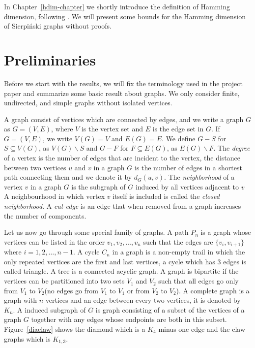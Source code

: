 \documentclass[12pt,a4paper,titlepage,openany]{report}
\begin{document}
In Chapter~\ref{hdim-chapter} we shortly introduce the definition of Hamming dimension, following \cite{Sandi}. We will present some bounds for the Hamming dimension of Sierpi\'nski graphs without proofs.



\chapter{Preliminaries}
\thispagestyle{fancy}

Before we start with the results, we will fix the terminology used in the project paper and summarize some basic result about graphs. We only consider finite, undirected, and simple graphs without isolated vertices.

 A graph consist of vertices which are connected by edges, and we write a graph $G$ as $G=(V,E)$, where $V$ is the vertex set and $E$ is the edge set in $G$. If $G=(V,E)$, we write $V(G)=V$ and $E(G)=E$. We define $G-S$ for $S\subseteq V(G)$, as $V(G)\backslash S$ and $G-F$ for $F\subseteq E(G)$, as $E(G)\backslash F$. The \emph{degree} of a vertex is the number of edges that are incident to the vertex, the distance between two vertices $u$ and $v$ in a graph $G$ is the number of edges in a shortest path connecting them and we denote it by $d_G(u,v)$. The \emph{neighborhood} of a vertex $v$ in a graph $G$ is the subgraph of $G$ induced by all vertices adjacent to $v$
A neighbourhood in which vertex $v$ itself is included is called the \emph{closed neighborhood}. A \emph{cut-edge} is an edge that when removed from a graph increases the number of components.

 Let us now go through some special family of graphs. A path $P_n$ is a graph whose vertices can be listed in the order $v_1, v_2,\ldots, v_n$ such that the edges are $\{v_i, v_{i+1}\}$ where $i = 1, 2,\ldots , n − 1$. A cycle $C_n$ in a graph is a non-empty trail in which the only repeated vertices are the first and last vertices, a cycle which has 3 edges is called triangle. A tree is a connected acyclic graph. A graph is bipartite if the vertices can be partitioned into two sets $V_1$ and $V_2$ such that all edges go only from $V_1$ to $V_2$(no edges go from $V_1$ to $V_1$ or from $V_2$ to $V_2$). A complete graph is a graph with $n$ vertices and an edge between every two vertices, it is denoted by $K_n$. A induced subgraph of $G$ is graph consisting of a subset of the vertices of a graph $G$ together with any edges whose endpoints are both in this subset. Figure~\ref{diaclaw} shows the diamond which is a $K_4$ minus one edge and the claw graphs which is $K_{1,3}$.
\end{document}
